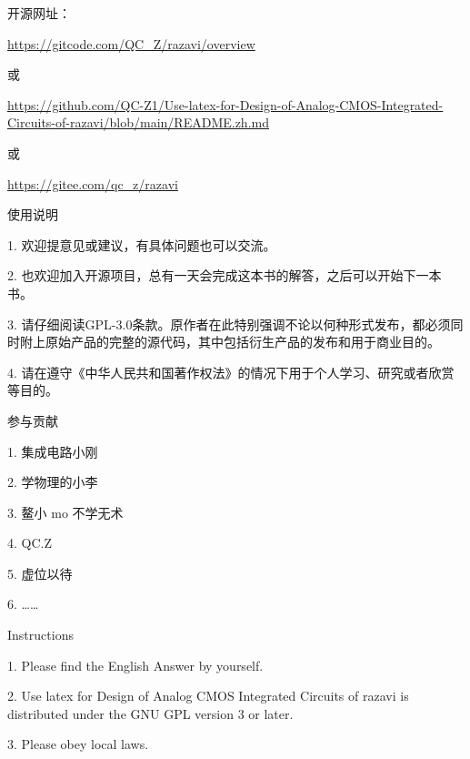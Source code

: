 


开源网址：

\url{https://gitcode.com/QC_Z/razavi/overview}

或

\url{https://github.com/QC-Z1/Use-latex-for-Design-of-Analog-CMOS-Integrated-Circuits-of-razavi/blob/main/README.zh.md}

或

\url{https://gitee.com/qc_z/razavi}


 使用说明

1.  欢迎提意见或建议，有具体问题也可以交流。

2.  也欢迎加入开源项目，总有一天会完成这本书的解答，之后可以开始下一本书。

3.  请仔细阅读GPL-3.0条款。原作者在此特别强调不论以何种形式发布，都必须同时附上原始产品的完整的源代码，其中包括衍生产品的发布和用于商业目的。

4.  请在遵守《中华人民共和国著作权法》的情况下用于个人学习、研究或者欣赏等目的。

 参与贡献

1.  集成电路小刚

2.  学物理的小李

3.  鳌小 mo 不学无术

4.  QC.Z

5.  虚位以待

6.  ……

 Instructions

1.  Please find the English Answer by yourself.

2.  Use latex for Design of Analog CMOS Integrated Circuits of razavi is distributed under the GNU GPL version 3 or later.

3.  Please obey local laws.